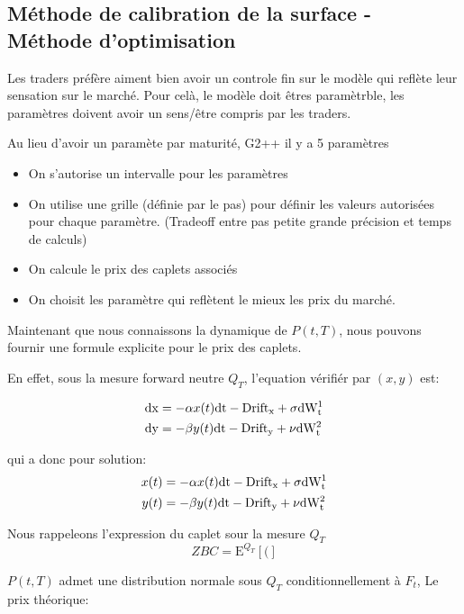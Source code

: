 \documentclass[paper=a4, fontsize=11pt]{report}
\numberwithin{equation}{section}		%
\numberwithin{figure}{section}			%
\numberwithin{table}{section}				%
\newcommand{\Qespr}[2]{
  \mathrm{E}^{#1} \left[ #2 \right]
}
\theoremstyle{definition}
\begin{document}
\subsection{Méthode de calibration de la surface - Méthode d'optimisation}

Les traders préfère aiment bien avoir un controle fin sur le modèle qui reflète leur sensation sur le marché. Pour celà, le modèle doit êtres paramètrble, les paramètres doivent avoir un sens/être compris par les traders.

Au lieu d'avoir un paramète par maturité, G2++ il y a 5 paramètres


\begin{itemize}
\item On s'autorise un intervalle pour les paramètres
\item On utilise une grille (définie par le pas) pour définir les valeurs
  autorisées pour chaque paramètre. (Tradeoff entre pas petite grande
  précision et temps de calculs)
\item On calcule le prix des caplets associés
\item On choisit les paramètre qui reflètent le mieux les prix du
  marché.
\end{itemize}

Maintenant que nous connaissons la dynamique de $P(t, T)$, nous pouvons fournir une formule explicite pour le prix des caplets.

En effet, sous la mesure forward neutre $Q_T$, l'equation vérifiér  par $(x, y)$ est:

\begin{align*}
  \rm{d}x &= -\alpha x(t) \rm{d}t - Drift_x + \sigma \rm{d}W^1_t \\
  \rm{d}y &= -\beta y(t) \rm{d}t - Drift_y + \nu \rm{d}W^2_t \\
\end{align*}

qui a donc pour solution:
\begin{align*}
  x(t) &= -\alpha x(t) \rm{d}t - Drift_x + \sigma \rm{d}W^1_t \\
  y(t) &= -\beta y(t) \rm{d}t - Drift_y + \nu \rm{d}W^2_t \\
\end{align*}

Nous rappeleons l'expression du caplet sour la mesure $Q_T$
$$ZBC = \Qespr{Q_T}{ ( } $$

$P(t, T)$ admet une distribution normale sous $Q_T$ conditionnellement à $F_t$, 
Le prix théorique:
\end{document}
